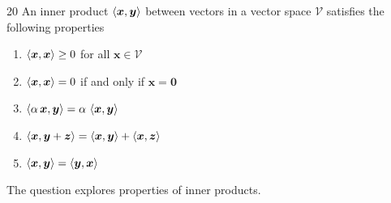 \documentclass{sotonExamBoxes}    %
\begin{document}
\begin{question}{20}
  An inner product $\left\langle \bm{x}, \bm{y}\right\rangle$ between vectors in a
  vector space $\mathcal{V}$ satisfies the following
  properties
  \begin{enumerate}\squeeze
  \item $\left\langle \bm{x}, \bm{x}\right\rangle \geq 0$ for all $\bm{x}\in\mathcal{V}$
  \item $\left\langle \bm{x}, \bm{x}\right\rangle = 0$  if and only if $\bm{x}=\bm{0}$
  \item $\left\langle \alpha\, \bm{x}, \bm{y}\right\rangle = \alpha\,
    \left\langle \bm{x}, \bm{y}\right\rangle$
  \item $\left\langle \bm{x}, \bm{y}+\bm{z}\right\rangle = \left\langle \bm{x}, \bm{y}\right\rangle +
    \left\langle \bm{x}, \bm{z}\right\rangle$
  \item $\left\langle \bm{x}, \bm{y}\right\rangle = \left\langle \bm{y}, \bm{x}\right\rangle$
  \end{enumerate}
  The question explores properties of inner products.
  \clearpage
  \begin{qparts}
\end{qparts}
\end{question}
\end{document}
